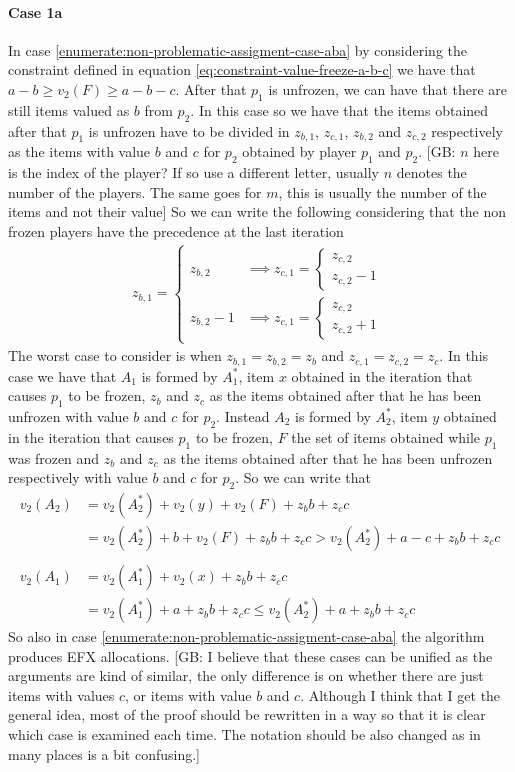 \documentclass{article}
\newcommand{\gb}[1]{{\color{red}[GB: #1]}}
\begin{document}
\paragraph{Case 1a}
In case \ref{enumerate:non-problematic-assigment-case-aba} by considering the constraint defined in equation \ref{eq:constraint-value-freeze-a-b-c} we have that $a-b\ge v_2(F)\ge a-b-c$. After that $p_1$ is unfrozen, we can have that there are still items valued as $b$ from $p_2$. In this case so we have that the items obtained after that $p_1$ is unfrozen have to be divided in $z_{b, 1}$, $z_{c, 1}$, $z_{b, 2}$ and  $z_{c, 2}$ respectively as the items with value $b$ and $c$ for $p_2$ obtained by player $p_1$ and $p_2$.
\gb{$n$ here is the index of the player? If so use a different letter, usually $n$ denotes the number of the players. The same goes for $m$, this is usually the number of the items and not their value} So we can write the following considering that the non frozen players have the precedence at the last iteration
\begin{align*}
z_{b,1} = \begin{cases} 
z_{b,2} &\implies z_{c,1} = \begin{cases} 
z_{c,2}\\
z_{c,2} -1
\end{cases}   \\
z_{b,2} -1 &\implies z_{c,1} = \begin{cases} 
z_{c,2}\\
z_{c,2} +1
\end{cases}   
\end{cases}
\end{align*}
The worst case to consider is when $z_{b,1} = z_{b,2} = z_b$ and $z_{c,1} = z_{c,2} = z_c$. In this case we have that $A_1$ is formed by $A_1^*$, item $x$ obtained in the iteration that causes $p_1$ to be frozen, $z_b$ and $z_c$ as the items obtained after that he has been unfrozen with value $b$ and $c$ for $p_2$. Instead $A_2$ is formed by $A_2^*$, item $y$ obtained in the iteration that causes $p_1$ to be frozen, $F$ the set of items obtained while $p_1$ was frozen and $z_b$ and $z_c$ as the items obtained after that he has been unfrozen respectively with value $b$ and $c$ for $p_2$. So we can write that 
\begin{align*}
    v_2(A_2) &= v_2(A_2^*) + v_2(y) + v_2(F) + z_b b + z_cc\\
    &= v_2(A_2^*) + b + v_2(F) + z_bb +  z_cc > v_2(A_2^*) + a-c + z_b b + z_cc\\\\
    v_2(A_1) &= v_2(A_1^*) + v_2(x) + z_bb + z_cc \\
    &=v_2(A_1^*) + a + z_bb + z_cc\le v_2(A_2^*) + a + z_bb + z_cc
\end{align*}
So also in case \ref{enumerate:non-problematic-assigment-case-aba} the algorithm produces EFX allocations.
\gb{I believe that these cases can be unified as the arguments are kind of similar, the only difference is on whether there are just items with values $c$, or items with value $b$ and $c$. Although I think that I get the general idea, most of the proof should be rewritten in a way so that it is clear which case is examined each time. The notation should be also changed as in many places is a bit confusing.}
\end{document}
